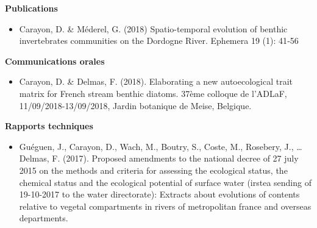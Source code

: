 \documentclass[localFont,alternative]{yaac-another-awesome-cv}
\begin{document}
\textbf{Publications}
\begin{itemize}
\item Carayon, D. \& Méderel, G. (2018) Spatio-temporal evolution of benthic invertebrates communities on the Dordogne River. Ephemera 19 (1): 41‑56
\end{itemize}

\textbf{Communications orales}
\begin{itemize}
\item Carayon, D. \& Delmas, F. (2018). Elaborating a new autoecological trait matrix for French stream benthic diatoms. 37ème colloque de l’ADLaF, 11/09/2018-13/09/2018, Jardin botanique de Meise, Belgique.
\end{itemize}

\textbf{Rapports techniques}
\begin{itemize}
\item Guéguen, J., Carayon, D., Wach, M., Boutry, S., Coste, M., Rosebery, J., … Delmas, F. (2017). Proposed amendments to the national decree of 27 july 2015 on the methods and criteria for assessing the ecological status, the chemical status and the ecological potential of surface water (irstea sending of 19-10-2017 to the water directorate): Extracts about evolutions of contents relative to vegetal compartments in rivers of metropolitan france and overseas departments.
\end{itemize}	
\end{document}
